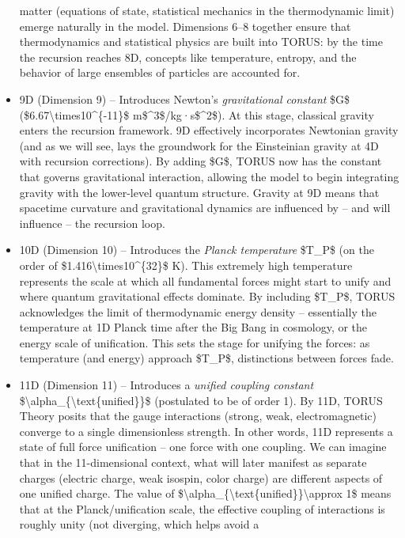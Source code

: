 \documentclass[]{article}
\begin{document}
\begin{itemize}
  matter (equations of state, statistical mechanics in the thermodynamic
  limit) emerge naturally in the model. Dimensions 6--8 together ensure
  that thermodynamics and statistical physics are built into TORUS: by
  the time the recursion reaches 8D, concepts like temperature, entropy,
  and the behavior of large ensembles of particles are accounted for.
\item
  9D (Dimension 9) -- Introduces Newton's \emph{gravitational constant}
  \$G\$ (\$6.67\textbackslash{}times10\^{}\{-11\}\$
  m\$\^{}3\$/kg·s\$\^{}2\$). At this stage, classical gravity enters the
  recursion framework. 9D effectively incorporates Newtonian gravity
  (and as we will see, lays the groundwork for the Einsteinian gravity
  at 4D with recursion corrections). By adding \$G\$, TORUS now has the
  constant that governs gravitational interaction, allowing the model to
  begin integrating gravity with the lower-level quantum structure.
  Gravity at 9D means that spacetime curvature and gravitational
  dynamics are influenced by -- and will influence -- the recursion
  loop.
\item
  10D (Dimension 10) -- Introduces the \emph{Planck temperature}
  \$T\_P\$ (on the order of \$1.416\textbackslash{}times10\^{}\{32\}\$
  K). This extremely high temperature represents the scale at which all
  fundamental forces might start to unify and where quantum
  gravitational effects dominate. By including \$T\_P\$, TORUS
  acknowledges the limit of thermodynamic energy density -- essentially
  the temperature at 1D Planck time after the Big Bang in cosmology, or
  the energy scale of unification. This sets the stage for unifying the
  forces: as temperature (and energy) approach \$T\_P\$, distinctions
  between forces fade.
\item
  11D (Dimension 11) -- Introduces a \emph{unified coupling constant}
  \$\textbackslash{}alpha\_\{\textbackslash{}text\{unified\}\}\$
  (postulated to be of order 1). By 11D, TORUS Theory posits that the
  gauge interactions (strong, weak, electromagnetic) converge to a
  single dimensionless strength. In other words, 11D represents a state
  of full force unification -- one force with one coupling. We can
  imagine that in the 11-dimensional context, what will later manifest
  as separate charges (electric charge, weak isospin, color charge) are
  different aspects of one unified charge. The value of
  \$\textbackslash{}alpha\_\{\textbackslash{}text\{unified\}\}\textbackslash{}approx
  1\$ means that at the Planck/uniﬁcation scale, the effective coupling
  of interactions is roughly unity (not diverging, which helps avoid a

\end{itemize}
\end{document}
